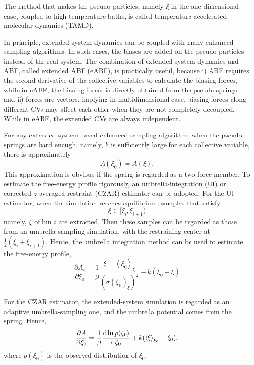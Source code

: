 The method that makes the pseudo particles, namely $\xi$ in the one-dimensional case, coupled to high-temperature baths, is called temperature accelerated molecular dynamics (TAMD).\cite{MaraglianoCPL2006} 

In principle, extended-system dynamics can be coupled with many enhanced-sampling algorithms. In such cases, the biases are added on the pseudo particles instead of the real system. The combination of extended-system dynamics and ABF, called extended ABF (eABF)\cite{FuJCTC2016}, is practically useful, because i) ABF requires the second derivative of the collective variables to calculate the biasing forces, while in eABF, the biasing forces is directly obtained from the pseudo springs and ii) forces are vectors, implying in multidimensional case, biasing forces along different CVs may affect each other when they are not completely decoupled. While in eABF, the extended CVs are always independent.

For any extended-system-based enhanced-sampling algorithm, when the pseudo springs are hard enough, namely, $k$ is sufficiently large for each collective variable, there is approximately
\begin{equation}
	A(\xi_0)=A(\xi).
\end{equation}
This approximation is obvious if the spring is regarded as a two-force member. To estimate the free-energy profile rigorously, an umbrella-integration (UI)\cite{ZhengJCTC2012} or corrected $z$-averaged restraint (CZAR)\cite{LesageJPCB2017} estimator can be adopted. For the UI estimator, when the simulation reaches equilibrium, samples that satisfy
\begin{equation}
	\xi \in [\xi_{i}, \xi_{i+1})
\end{equation}
namely, $\xi$ of bin $i$ are extracted. Then these samples can be regarded as those from an umbrella sampling simulation, with the restraining center at $\frac{1}{2}(\xi_{i} + \xi_{i+1})$. Hence, the umbrella integration method can be used to estimate the free-energy profile,
\begin{equation}
	\frac{\partial A_{i}}{\partial \xi_{0}}=\frac{1}{\beta }\frac{\xi - \left \langle \xi_{0} \right \rangle_{\xi}}{(\sigma ( \xi_{0})_{\xi})^{2} }-k(\xi_{0} - \xi)
\end{equation}

For the CZAR estimator, the extended-system simulation is regarded as an adaptive umbrella-sampling one, and the umbrella potential comes from the spring. Hence,
\begin{equation}
	\frac{\partial A}{\partial \xi_0}=\frac{1}{\beta }\frac{\mathop{}\!\mathrm{d} \ln p(\xi_0)}{\mathop{}\!\mathrm{d} \xi_0} + k(\left \langle  \xi \right \rangle_{\xi_0}-\xi_0),
\end{equation}
where $p(\xi_0)$ is the observed distribution of $\xi_0$.
